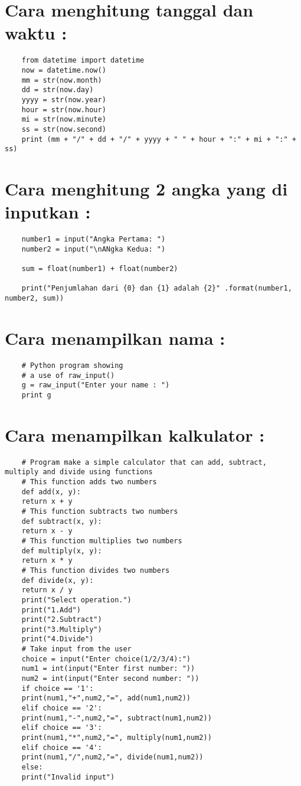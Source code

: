 \documentclass{article}
\begin{document}
\section {Cara menghitung tanggal dan waktu :}
\begin{lstlisting}
	from datetime import datetime
	now = datetime.now()
	mm = str(now.month)
	dd = str(now.day)
	yyyy = str(now.year)
	hour = str(now.hour)
	mi = str(now.minute)
	ss = str(now.second)
	print (mm + "/" + dd + "/" + yyyy + " " + hour + ":" + mi + ":" + ss)
\end{lstlisting}

\section {Cara menghitung 2 angka yang di inputkan :}
\begin{lstlisting}
	number1 = input("Angka Pertama: ")
	number2 = input("\nANgka Kedua: ")
	
	sum = float(number1) + float(number2)
	
	print("Penjumlahan dari {0} dan {1} adalah {2}" .format(number1, number2, sum)) 
\end{lstlisting}

\section {Cara  menampilkan nama :}
\begin{lstlisting}
	# Python program showing
	# a use of raw_input()
	g = raw_input("Enter your name : ")
	print g 
\end{lstlisting}

\section {Cara  menampilkan kalkulator :}
\begin{lstlisting}
	# Program make a simple calculator that can add, subtract, multiply and divide using functions
	# This function adds two numbers
	def add(x, y):
	return x + y
	# This function subtracts two numbers
	def subtract(x, y):
	return x - y
	# This function multiplies two numbers
	def multiply(x, y):
	return x * y
	# This function divides two numbers
	def divide(x, y):
	return x / y
	print("Select operation.")
	print("1.Add")
	print("2.Subtract")
	print("3.Multiply")
	print("4.Divide")
	# Take input from the user
	choice = input("Enter choice(1/2/3/4):")
	num1 = int(input("Enter first number: "))
	num2 = int(input("Enter second number: "))
	if choice == '1':
	print(num1,"+",num2,"=", add(num1,num2))
	elif choice == '2':
	print(num1,"-",num2,"=", subtract(num1,num2))
	elif choice == '3':
	print(num1,"*",num2,"=", multiply(num1,num2))
	elif choice == '4':
	print(num1,"/",num2,"=", divide(num1,num2))
	else:
	print("Invalid input")
\end{lstlisting}
\end{document}
